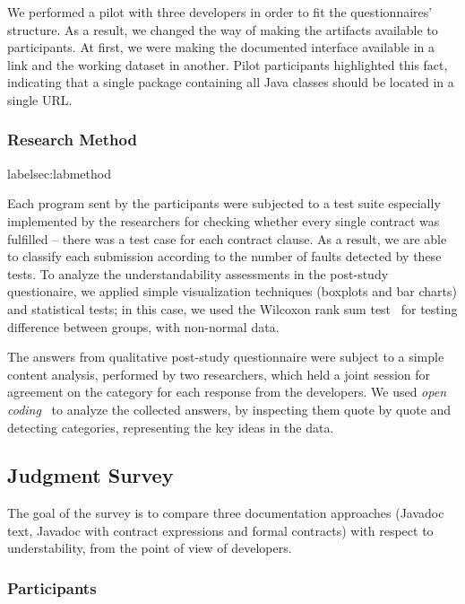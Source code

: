 We performed a pilot with three developers in order to fit the questionnaires' structure.
As a result, we changed the way of making the artifacts available to participants. 
At first, we were making the documented interface available in a link and the working dataset in another. 
Pilot participants highlighted this fact, indicating that a single package containing all Java classes should be located in a single URL.

\subsubsection{Research Method}
label{sec:labmethod}

Each program sent by the participants were subjected to a test suite especially implemented by the researchers for checking whether every single contract was fulfilled -- there was a test case for each contract clause.
As a result, we are able to classify each submission according to the number of faults detected by these tests.
To analyze the understandability assessments in the post-study questionaire, we applied simple visualization techniques (boxplots and bar charts) and statistical tests; in this case, we used the Wilcoxon rank sum test~\cite{statistical} for testing difference between groups, with non-normal data.

The answers from qualitative post-study questionnaire were subject to a simple content analysis, performed by two researchers, which held a joint session for agreement on the category for each response from the developers. 
 We used \emph{open coding}~\cite{Price2010} to analyze the collected answers, by inspecting them quote by quote and detecting categories, representing the key ideas in the data.




\subsection{Judgment Survey}
\label{sec:survey}

The goal of the survey is to compare three documentation approaches (Javadoc text, Javadoc with contract expressions and formal contracts) with respect to understability, from the point of view of developers. 

\subsubsection{Participants}
\label{sec:surveyPart}

